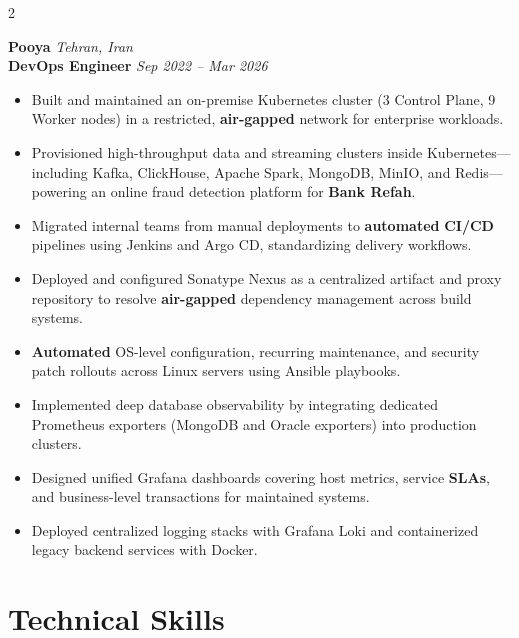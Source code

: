 \documentclass[10pt,a4paper]{article}
\begin{document}
\begin{paracol}{2}
\vspace{8pt}

\textbf{Pooya} \hfill \textit{Tehran, Iran}\\
\textbf{DevOps Engineer} \hfill \textit{Sep 2022 -- Mar 2026}
\begin{itemize}
    \item Built and maintained an on-premise Kubernetes cluster (3 Control Plane, 9 Worker nodes) in a restricted, \textbf{air-gapped} network for enterprise workloads.
    \item Provisioned high-throughput data and streaming clusters inside Kubernetes---including Kafka, ClickHouse, Apache Spark, MongoDB, MinIO, and Redis---powering an online fraud detection platform for \textbf{Bank Refah}.
    \item Migrated internal teams from manual deployments to \textbf{automated} \textbf{CI/CD} pipelines using Jenkins and Argo CD, standardizing delivery workflows.
    \item Deployed and configured Sonatype Nexus as a centralized artifact and proxy repository to resolve \textbf{air-gapped} dependency management across build systems.
    \item \textbf{Automated} OS-level configuration, recurring maintenance, and security patch rollouts across Linux servers using Ansible playbooks.
    \item Implemented deep database observability by integrating dedicated Prometheus exporters (MongoDB and Oracle exporters) into production clusters.
    \item Designed unified Grafana dashboards covering host metrics, service \textbf{SLAs}, and business-level transactions for maintained systems.
    \item Deployed centralized logging stacks with Grafana Loki and containerized legacy backend services with Docker.
\end{itemize}

\vspace{8pt}

\section{Technical Skills}


\end{paracol}
\end{document}
